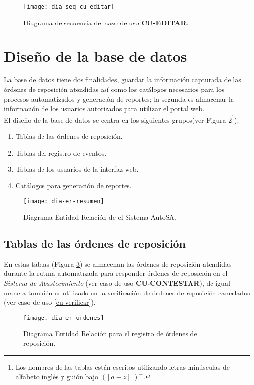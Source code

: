 \begin{figure}[h]
	\centering
	\texttt{[image: dia-seq-cu-editar]}
	\caption{Diagrama de secuencia del caso de uso \textbf{CU-EDITAR}.}
	\label{fig:dia-seq-cu-editar}
\end{figure}



\newpage
\section{Diseño de la base de datos}
La base de datos tiene dos finalidades, guardar la información capturada de las órdenes de reposición atendidas así como los catálogos necesarios para los procesos automatizados y generación de reportes; la segunda es almacenar la información de los usuarios autorizados para utilizar el portal web.\\
El diseño de la base de datos se centra en los siguientes grupos(ver Figura \ref{fig:dia-er-resumen}\footnote{Los nombres de las tablas están escritos utilizando letras minúsculas de alfabeto inglés y guión bajo $([a-z]{\_})^+$.}):
\begin{enumerate}
	\item Tablas de las órdenes de reposición.
	\item Tablas del registro de eventos.
	\item Tablas de los usuarios de la interfaz web.
	\item Catálogos para generación de reportes.
\end{enumerate}
\begin{figure}[h]
  \centering
  \texttt{[image: dia-er-resumen]}
  \caption{Diagrama Entidad Relación de el Sistema AutoSA.}
  \label{fig:dia-er-resumen}
\end{figure}


\subsection{Tablas de las órdenes de reposición}
En estas tablas (Figura \ref{fig:dia-er-ordenes}) se almacenan las órdenes de reposición atendidas durante la rutina automatizada para responder órdenes de reposición en el \textit{Sistema de Abastecimiento} (ver caso de uso \textbf{CU-CONTESTAR}), de igual manera también es utilizada en la verificación de órdenes de reposición canceladas (ver caso de uso \ref{cu-verificar}).
\begin{figure}[h]
  \centering
  \texttt{[image: dia-er-ordenes]} 
  \caption{Diagrama Entidad Relación para el registro de órdenes de reposición.}
  \label{fig:dia-er-ordenes}
\end{figure}

